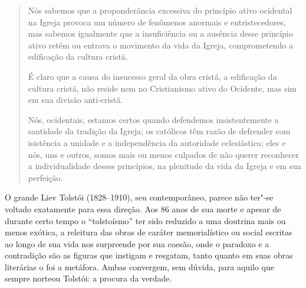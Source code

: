 \begin{quote}
Nós sabemos que a proponderância excessiva do princípio ativo ocidental
na Igreja provoca um número de fenômenos anormais e entristecedores, mas
sabemos igualmente que a insuficiência ou a ausência desse princípio
ativo retém ou entrava o movimento da vida da Igreja, comprometendo a
edificação da cultura cristã.

É claro que a causa do insucesso geral da obra cristã, a edificação da
cultura cristã, não reside nem no Cristianismo ativo do Ocidente, mas
sim em sua divisão anti-cristã.

Nós, ocidentais, estamos certos quando defendemos insistentemente a
santidade da tradição da Igreja; os católicos têm razão de defrender com
isistência a unidade e a independência da autoridade eclesiástica; eles
e nós, uns e outros, somos mais ou menos culpados de não querer
reconhecer a individualidade desses princípios, na plenitude da vida da
Igreja e em sua perfeição.
\end{quote}

O grande Liev Tolstói (1828--1910), seu contemporâneo, parece não
ter"-se voltado exatamente para essa direção. Aos 86 anos de sua
morte e apesar de durante certo tempo o ``tolstoísmo'' ter
sido reduzido a uma doutrina mais ou menos exótica, a releitura das
obras de caráter memorialístico ou social escritas ao longo de sua vida
nos surpreende por sua coesão, onde o paradoxo e a contradição são as
figuras que instigam e resgatam, tanto quanto em suas obras literárias o
foi a metáfora. Ambas convergem, sem dúvida, para aquilo que sempre
norteou Tolstói: a procura da verdade.

